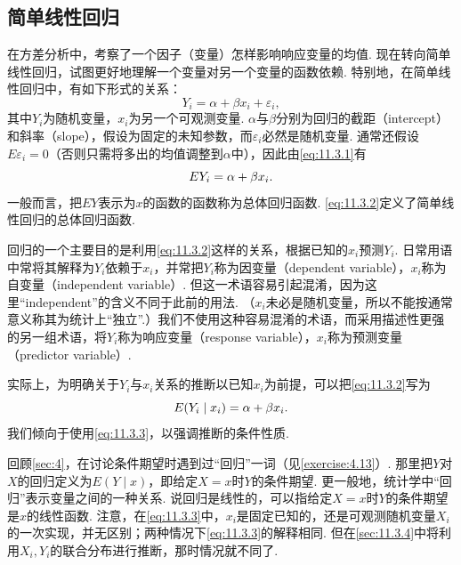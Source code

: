 \subsection{简单线性回归}\label{sec:11.3}
在方差分析中，考察了一个因子（变量）怎样影响响应变量的均值. 现在转向简单线性回归，试图更好地理解一个变量对另一个变量的函数依赖. 特别地，在简单线性回归中，有如下形式的关系：
\begin{equation}\label{eq:11.3.1}
Y_i=\alpha+\beta x_i+\varepsilon_i,
\end{equation}
其中$Y_i$为随机变量，$x_i$为另一个可观测变量. $\alpha$与$\beta$分别为回归的截距（intercept）和斜率（slope），假设为固定的未知参数，而$\varepsilon_i$必然是随机变量. 通常还假设$E\varepsilon_i=0$（否则只需将多出的均值调整到$\alpha$中），因此由\eqref{eq:11.3.1}有
\begin{equation}\label{eq:11.3.2}\index{SI0901@总体}
EY_i=\alpha+\beta x_i.
\end{equation}
一般而言，把$EY$表示为$x$的函数的函数称为总体回归函数. \eqref{eq:11.3.2}定义了简单线性回归的总体回归函数.

回归的一个主要目的是利用\eqref{eq:11.3.2}这样的关系，根据已知的$x_i$预测$Y_i$. 日常用语中常将其解释为$Y_i$依赖于$x_i$，并常把$Y_i$称为因变量（dependent variable），$x_i$称为自变量（independent variable）.
但这一术语容易引起混淆，因为这里“independent”的含义不同于此前的用法. （$x_i$未必是随机变量，所以不能按通常意义称其为统计上“独立”.）我们不使用这种容易混淆的术语，而采用描述性更强的另一组术语，将$Y_i$称为响应变量（response variable），$x_i$称为预测变量（predictor variable）.

实际上，为明确关于$Y_i$与$x_i$关系的推断以已知$x_i$为前提，可以把\eqref{eq:11.3.2}写为
\begin{equation}\label{eq:11.3.3}\index{SI0884@条件期望}
E(Y_i\mid x_i)=\alpha+\beta x_i.
\end{equation}
我们倾向于使用\eqref{eq:11.3.3}，以强调推断的条件性质.

回顾\autoref{sec:4}，在讨论条件期望时遇到过“回归”一词（见\autoref{exercise:4.13}）. 那里把$Y$对$X$的回归定义为$E(Y\mid x)$，即给定$X=x$时$Y$的条件期望. 更一般地，统计学中“回归”表示变量之间的一种关系. 说回归是线性的，可以指给定$X=x$时$Y$的条件期望是$x$的线性函数. 注意，在\eqref{eq:11.3.3}中，$x_i$是固定已知的，还是可观测随机变量$X_i$的一次实现，并无区别；两种情况下\eqref{eq:11.3.3}的解释相同. 但在\autoref{sec:11.3.4}中将利用$X_i,Y_i$的联合分布进行推断，那时情况就不同了.

